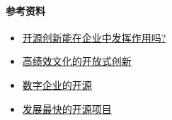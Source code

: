 \hypertarget{ux53c2ux8003ux8d44ux6599}{%
\paragraph{参考资料}\label{ux53c2ux8003ux8d44ux6599}}

\begin{itemize}
\tightlist
\item
  \href{https://www.threefivetwo.com/blog/can-open-source-innovation-work-in-the-enterprise}{开源创新能在企业中发挥作用吗?}
\item
  \href{https://www.nearform.com/blog/want-a-high-performing-culture-make-way-for-open-innovation}{高绩效文化的开放式创新}
\item
  \href{https://www.cio.com/article/3213146/open-source-is-powering-the-digital-enterprise.html}{数字企业的开源}
\item
  \href{https://www.cncf.io/blog/2017/06/05/30-highest-velocity-open-source-projects}{发展最快的开源项目}
\end{itemize}
